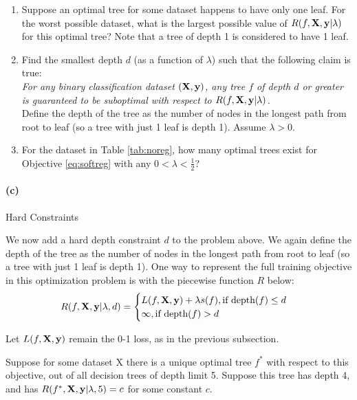 \documentclass{exam}
\begin{document}
\begin{enumerate}[i]
    \item Suppose an optimal tree for some dataset happens to have only one leaf. For the worst possible dataset, what is the largest possible value of $R(f, \mathbf{X}, \mathbf{y} | \lambda)$ for this optimal tree? Note that a tree of depth 1 is considered to have 1 leaf.

    \item Find the smallest depth $d$ (as a function of $\lambda$) such that the following claim is true:\\ \textit{For any binary classification dataset $(\mathbf{X}, \mathbf{y})$, any tree $f$ of depth $d$ or greater is guaranteed to be suboptimal with respect to $R(f, \mathbf{X}, \mathbf{y} | \lambda)$. }\\
    Define the depth of the tree as the number of nodes in the longest path from root to leaf (so a tree with just 1 leaf is depth 1). Assume $\lambda > 0$.

    \item For the dataset in Table \ref{tab:noreg}, how many optimal trees exist for Objective \ref{eq:softreg} with any $0 <  \lambda < \frac{1}{2}$?

\end{enumerate}

\paragraph{(c)}Hard Constraints

We now add a hard depth constraint $d$ to the problem above. We again define the depth of the tree as the number of nodes in the longest path from root to leaf (so a tree with just 1 leaf is depth 1). One way to represent the full training objective in this optimization problem is with the piecewise function $R$ below:
\begin{equation}
\label{eq:hardreg}
R(f, \mathbf{X}, \mathbf{y} | \lambda, d) = \begin{cases}
    L(f, \mathbf{X}, \mathbf{y}) + \lambda s(f) ,  \text{if }\textrm{depth}(f) \leq d \\
    \infty, \text{if }\textrm{depth}(f) > d
\end{cases}
\end{equation}

Let $L(f, \mathbf{X}, \mathbf{y})$ remain the 0-1 loss, as in the previous subsection. 

Suppose for some dataset X there is a unique optimal tree $f^*$ with respect to this objective, out of all decision trees of depth limit 5. Suppose this tree has depth 4, and has $R(f^*, \mathbf{X}, \mathbf{y} | \lambda, 5) = c$ for some constant $c$.
\end{document}
